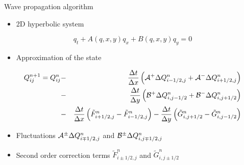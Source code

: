\documentclass[xcolor=dvipsnames]{beamer}
\begin{document}
\begin{frame}[label=sec-4-3]{Wave propagation algorithm}
\begin{itemize}
\item 2D hyperbolic system
\end{itemize}
\begin{equation*}
q_t + A(q,x,y)q_x + B(q,x,y)q_y = 0
\end{equation*}
\begin{itemize}
\item Approximation of the state
\end{itemize}
\begin{eqnarray*}
Q_{ij}^{n+1} = Q_{ij}^n &-& \frac{\Delta t}{\Delta x} \left({\cal A}^+\Delta Q_{i-1/2,j}^n + {\cal A}^-\Delta Q_{i+1/2,j}^n\right) \\
               &-& \frac{\Delta t}{\Delta y} \left({\cal B}^+\Delta Q_{i,j-1/2}^n + {\cal B}^-\Delta Q_{i,j+1/2}^n\right)\\
               &-&\frac{\Delta t}{\Delta x} \left(\tilde F_{i+1/2,j}^n - \tilde F_{i-1/2,j}^n\right) - \frac{\Delta t}{\Delta y} \left(\tilde G_{i,j+1/2}^n - \tilde G_{i,j-1/2}^n\right)
\end{eqnarray*}
\begin{itemize}
\item Fluctuations ${\cal A}^\pm\Delta Q_{i\mp 1/2,j}^n$ and ${\cal B}^\pm\Delta Q_{i,j\mp 1/2,j}^n$
\item Second order correction terms $\tilde F_{i\pm 1/2,j}^n$ and $\tilde G_{i,j\pm 1/2}^n$
\end{itemize}
\end{frame}
\end{document}
